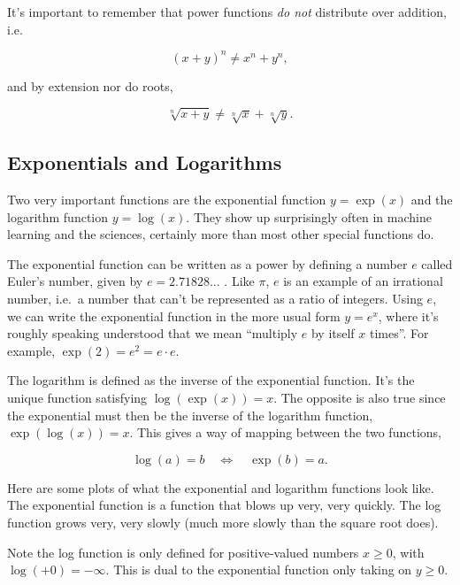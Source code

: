 \documentclass[
  letterpaper,
  DIV=11,
  numbers=noendperiod]{scrreprt}
\begin{document}
It's important to remember that power functions \emph{do not} distribute
over addition, i.e.

\[(x+y)^n \neq x^n + y^n,\]

and by extension nor do roots,

\[\sqrt[n]{x+y} \neq \sqrt[n]{x} + \sqrt[n]{y}.\]

\hypertarget{exponentials-and-logarithms}{%
\subsection{Exponentials and
Logarithms}\label{exponentials-and-logarithms}}

Two very important functions are the exponential function \(y=\exp(x)\)
and the logarithm function \(y=\log(x)\). They show up surprisingly
often in machine learning and the sciences, certainly more than most
other special functions do.

The exponential function can be written as a power by defining a number
\(e\) called Euler's number, given by \(e = 2.71828\dots\) . Like
\(\pi\), \(e\) is an example of an irrational number, i.e.~a number that
can't be represented as a ratio of integers. Using \(e\), we can write
the exponential function in the more usual form \(y=e^x\), where it's
roughly speaking understood that we mean ``multiply \(e\) by itself
\(x\) times''. For example, \(\exp(2) = e^2 = e \cdot e\).

The logarithm is defined as the inverse of the exponential function.
It's the unique function satisfying \(\log(\exp(x)) = x\). The opposite
is also true since the exponential must then be the inverse of the
logarithm function, \(\exp(\log(x)) = x\). This gives a way of mapping
between the two functions,

\[\log(a) = b \quad \Longleftrightarrow \quad \exp(b) = a.\]

Here are some plots of what the exponential and logarithm functions look
like. The exponential function is a function that blows up very, very
quickly. The log function grows very, very slowly (much more slowly than
the square root does).

Note the log function is only defined for positive-valued numbers
\(x \geq 0\), with \(\log(+0)=-\infty\). This is dual to the exponential
function only taking on \(y \geq 0\).
\end{document}
